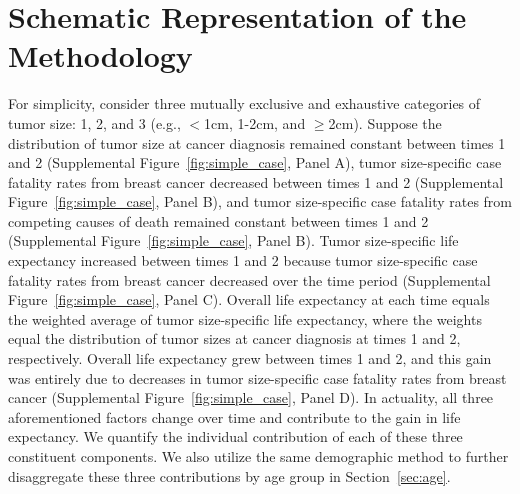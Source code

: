 \documentclass[11pt,letterpaper]{article}
\theoremstyle{plain}
\theoremstyle{remark}
\numberwithin{equation}{section}
\begin{document}
\section{Schematic Representation of the Methodology}
For simplicity, consider three mutually exclusive and exhaustive
categories of tumor size: 1, 2, and 3 (e.g., $<$1cm, 1-2cm, and
$\geq$2cm).  Suppose the distribution of tumor size at cancer
diagnosis remained constant between times 1 and 2 (Supplemental
Figure~\ref{fig:simple_case}, Panel A), tumor size-specific case
fatality rates from breast cancer decreased between times 1 and 2
(Supplemental Figure~\ref{fig:simple_case}, Panel B), and tumor
size-specific case fatality rates from competing causes of death
remained constant between times 1 and 2 (Supplemental
Figure~\ref{fig:simple_case}, Panel B).  Tumor size-specific life
expectancy increased between times 1 and 2 because tumor size-specific
case fatality rates from breast cancer decreased over the time period
(Supplemental Figure~\ref{fig:simple_case}, Panel C).  Overall life
expectancy at each time equals the weighted average of tumor
size-specific life expectancy, where the weights equal the
distribution of tumor sizes at cancer diagnosis at times 1 and 2,
respectively.  Overall life expectancy grew between times 1 and 2, and
this gain was entirely due to decreases in tumor size-specific case
fatality rates from breast cancer (Supplemental
Figure~\ref{fig:simple_case}, Panel D).  In actuality, all three
aforementioned factors change over time and contribute to the gain in
life expectancy.  We quantify the individual contribution of each of
these three constituent components.  We also utilize the same
demographic method to further disaggregate these three contributions
by age group in Section~\ref{sec:age}.
\end{document}

